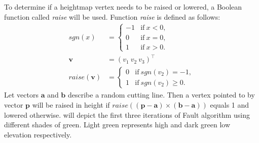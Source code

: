 \documentclass[11pt,a4paper,twoside,openright]{report}
\begin{document}
To determine if a heightmap vertex needs to be raised or lowered, a Boolean function called \emph{raise} will be used. Function \emph{raise} is defined as follows:
\begin{align*}
sgn(x) &=
\begin{cases}
  -1 & \text{if}\ x < 0, \\
  0 & \text{if}\ x = 0, \\
  1 & \text{if}\ x > 0.
\end{cases} \\
\mathbf{v} &= (v_1\ v_2\ v_3)^\intercal \\
raise(\mathbf{v}) &=
\begin{cases}
  0 & \text{if}\ sgn(v_2) = -1, \\
  1 & \text{if}\ sgn(v_2) \geq 0.
\end{cases}
\end{align*}
Let vectors $\mathbf{a}$ and $\mathbf{b}$ describe a random cutting line. Then a vertex pointed to by vector $\mathbf{p}$ will be raised in height if $raise((\mathbf{p}-\mathbf{a}) \times (\mathbf{b} - \mathbf{a}))$ equals 1 and lowered otherwise.  will depict the first three iterations of Fault algorithm using different shades of green. Light green represents high and dark green low elevation respectively.
\end{document}

